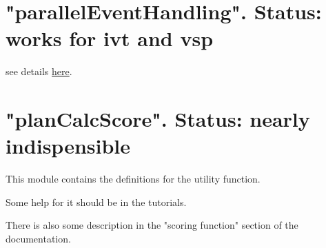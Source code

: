 







\section{"parallelEventHandling". Status: works for ivt and vsp}


see details \href{http://matsim.org/node/238}{here}.



\umbruch
\section{"planCalcScore". Status: nearly indispensible}


This module contains the definitions for the utility function.

Some help for it should be in the tutorials.

There is also some description in the "scoring function" section of the documentation.

\umbruch
